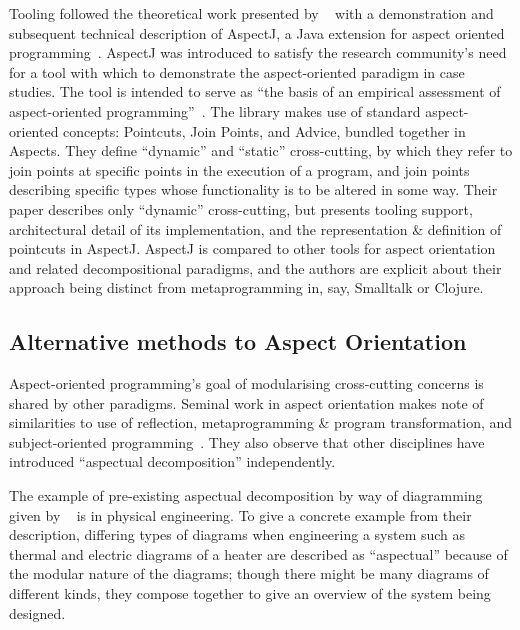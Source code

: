 Tooling followed the theoretical work presented by
\citeauthor{kiczales1997aspect}~\cite{kiczales1997aspect} with a demonstration
and subsequent technical description of AspectJ, a Java extension for aspect
oriented programming~\cite{AspectJLanguageAndTools,aspectj_intro}. AspectJ was
introduced to satisfy the research community's need for a tool with which to
demonstrate the aspect-oriented paradigm in case studies. The tool is intended
to serve as ``the basis of an empirical assessment of aspect-oriented
programming''~\cite{aspectj_intro}. The library makes use of standard
aspect-oriented concepts: Pointcuts, Join Points, and Advice, bundled together
in Aspects. They define ``dynamic'' and ``static'' cross-cutting, by which they
refer to join points at specific points in the execution of a program, and join
points describing specific types whose functionality is to be altered in some
way. Their paper describes only ``dynamic'' cross-cutting, but presents tooling
support, architectural detail of its implementation, and the representation \&
definition of pointcuts in AspectJ. AspectJ is compared to other tools for
aspect orientation and related decompositional paradigms, and the authors are
explicit about their approach being distinct from metaprogramming in, say,
Smalltalk or Clojure.

\subsection{Alternative methods to Aspect Orientation}

Aspect-oriented programming's goal of modularising cross-cutting concerns is
shared by other paradigms. Seminal work in aspect orientation makes note of
similarities to use of reflection, metaprogramming \& program transformation,
and subject-oriented programming~\cite{kiczales1997aspect,aspectj_intro}. They
also observe that other disciplines have introduced ``aspectual decomposition''
independently.

The example of pre-existing aspectual decomposition by way of diagramming given
by \citeauthor{kiczales1997aspect}~\cite{kiczales1997aspect} is in physical
engineering. To give a concrete example from their description, differing types
of diagrams when engineering a system such as thermal and electric diagrams of a
heater are described as ``aspectual'' because of the modular nature of the
diagrams; though there might be many diagrams of different kinds, they compose
together to give an overview of the system being designed.

